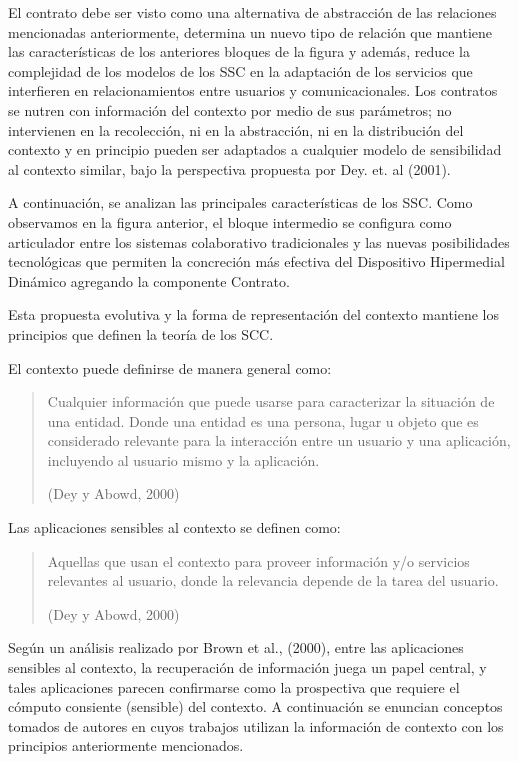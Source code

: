 El contrato debe ser visto como una alternativa de abstracción de las relaciones
mencionadas anteriormente, determina un nuevo tipo de relación que mantiene las
características de los anteriores bloques de la figura y además, reduce la
complejidad de
los modelos de los SSC en la adaptación de los servicios que interfieren
en
relacionamientos entre usuarios y comunicacionales. Los contratos se nutren con
información del contexto por medio de sus parámetros; no intervienen en la
recolección,
ni en la abstracción, ni en la distribución del contexto y en principio pueden
ser
adaptados a cualquier modelo de sensibilidad al contexto similar, bajo la
perspectiva propuesta por Dey. et. al (2001).


A continuación, se analizan las principales características de los
SSC.
Como observamos en la figura anterior, el bloque intermedio se configura como
articulador entre los sistemas colaborativo tradicionales y las
nuevas posibilidades
tecnológicas que permiten la concreción más efectiva del Dispositivo
Hipermedial
Dinámico agregando la componente Contrato.

Esta propuesta evolutiva y la forma de representación del contexto mantiene
los principios que definen la teoría de los SCC.

El contexto puede definirse de manera general como:

\begin{quote}
Cualquier información que puede usarse para caracterizar la situación de
una entidad. Donde una entidad es una persona, lugar u objeto que es
considerado relevante para la interacción entre un usuario y una
aplicación, incluyendo al usuario mismo y la aplicación.
\begin{flushright}(Dey y Abowd, 2000)\end{flushright}
\end{quote}  


Las aplicaciones sensibles al contexto se definen  como:


\begin{quote}
Aquellas que usan el contexto para proveer información y/o servicios
relevantes al usuario, donde la relevancia depende de la tarea del usuario.
\begin{flushright}(Dey y Abowd, 2000)\end{flushright}
\end{quote}

Según un análisis realizado por Brown et al., (2000), entre las aplicaciones sensibles al contexto, la recuperación de información juega un papel central, y tales aplicaciones parecen confirmarse como la prospectiva que requiere el cómputo consiente (sensible) del contexto. A continuación se enuncian conceptos tomados de autores en cuyos trabajos utilizan la información de contexto con los principios anteriormente mencionados.


